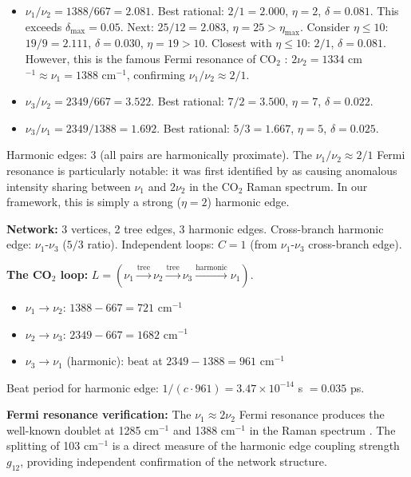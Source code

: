 \documentclass[11pt,twocolumn,a4paper]{article}
\theoremstyle{definition}
\theoremstyle{remark}
\newcommand{\etamax}{\eta_{\mathrm{max}}}
\begin{document}
\begin{itemize}[nosep]
\item $\nu_1/\nu_2 = 1388/667 = 2.081$. Best rational: $2/1 = 2.000$, $\eta = 2$, $\delta = 0.081$. This exceeds $\delta_{\max} = 0.05$. Next: $25/12 = 2.083$, $\eta = 25 > \etamax$. Consider $\eta \leq 10$: $19/9 = 2.111$, $\delta = 0.030$, $\eta = 19 > 10$. Closest with $\eta \leq 10$: $2/1$, $\delta = 0.081$. However, this is the famous Fermi resonance of CO$_2$ \citep{fermi1931}: $2\nu_2 = 1334$ cm$^{-1} \approx \nu_1 = 1388$ cm$^{-1}$, confirming $\nu_1/\nu_2 \approx 2/1$.
\item $\nu_3/\nu_2 = 2349/667 = 3.522$. Best rational: $7/2 = 3.500$, $\eta = 7$, $\delta = 0.022$.
\item $\nu_3/\nu_1 = 2349/1388 = 1.692$. Best rational: $5/3 = 1.667$, $\eta = 5$, $\delta = 0.025$.
\end{itemize}

Harmonic edges: 3 (all pairs are harmonically proximate). The $\nu_1/\nu_2 \approx 2/1$ Fermi resonance is particularly notable: it was first identified by \citet{fermi1931} as causing anomalous intensity sharing between $\nu_1$ and $2\nu_2$ in the CO$_2$ Raman spectrum. In our framework, this is simply a strong ($\eta = 2$) harmonic edge.

\textbf{Network:} 3 vertices, 2 tree edges, 3 harmonic edges. Cross-branch harmonic edge: $\nu_1$-$\nu_3$ ($5/3$ ratio). Independent loops: $C = 1$ (from $\nu_1$-$\nu_3$ cross-branch edge).

\textbf{The CO$_2$ loop:} $L = (\nu_1 \xrightarrow{\text{tree}} \nu_2 \xrightarrow{\text{tree}} \nu_3 \xrightarrow{\text{harmonic}} \nu_1)$.
\begin{itemize}[nosep]
\item $\nu_1 \to \nu_2$: $1388 - 667 = 721$ cm$^{-1}$
\item $\nu_2 \to \nu_3$: $2349 - 667 = 1682$ cm$^{-1}$
\item $\nu_3 \to \nu_1$ (harmonic): beat at $2349 - 1388 = 961$ cm$^{-1}$
\end{itemize}

Beat period for harmonic edge: $1/(c \cdot 961) = 3.47 \times 10^{-14}$ s $= 0.035$ ps.

\textbf{Fermi resonance verification:} The $\nu_1 \approx 2\nu_2$ Fermi resonance produces the well-known doublet at 1285 cm$^{-1}$ and 1388 cm$^{-1}$ in the Raman spectrum \citep{fermi1931, herzberg1945}. The splitting of 103 cm$^{-1}$ is a direct measure of the harmonic edge coupling strength $g_{12}$, providing independent confirmation of the network structure.
\end{document}
